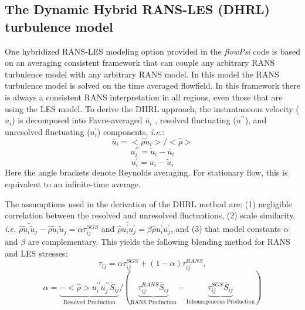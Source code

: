 \subsection{The Dynamic Hybrid RANS-LES (DHRL) turbulence model}

One hybridized RANS-LES modeling option provided in the {\it flowPsi}
code is based on an averaging consistent framework that can couple any
arbitrary RANS turbulence model with any arbitrary RANS model.  In
this model the RANS turbulence model is solved on the time averaged
flowfield.  In this framework there is always a consistent RANS
interpretation in all regions, even those that are using the LES
model.  To derive the DHRL approach, the instantaneous velocity
($u_i$) is decomposed into Favre-averaged $\overline{u}_i$ , resolved
fluctuating ($u^{\prime\prime}$), and unresolved fluctuating
($u^\prime_i$) components, {\it i.e.}:
\begin{equation}
\overline{u}_i = <\hat{\rho} \tilde{u}_i>/<\hat{\rho}>
\end{equation}
\begin{equation}
u^{\prime\prime}_i = \tilde{u}_i - \overline{u}_i
\end{equation}
\begin{equation}
u^\prime_i = u_i - \tilde{u}_i
\end{equation}
Here the angle brackets denote Reynolds averaging.  For stationary flow, this is equivalent to an infinite-time average.

The assumptions used in the derivation of the DHRL method are: (1)
negligible correlation between the resolved and unresolved
fluctuations, (2) scale similarity, {\it i.e.}
$\hat{\rho}\widetilde{\tilde{u}_i\tilde{u}_j} -
\hat{\rho}\tilde{u}_i\tilde{u}_j = \alpha \tau^{SGS}_{ij}$ and
$\hat{\rho}\widetilde{u^\prime_i u^\prime_j} = \beta
\hat{\rho}\overline{u^{\prime}_i u^{\prime}_j}$, and (3) that model
constants $\alpha$ and $\beta$ are complementary.  This yields the
following blending method for RANS and LES stresses:
\begin{equation}
\tau_{ij} = \alpha \tau^{SGS}_{ij} + (1-\alpha)\tau^{RANS}_{ij},
\label{eq:dhrlblend}
\end{equation}
\begin{equation}
\alpha = \underbrace{-<\hat{\rho}> \overline{u^{\prime\prime}_i u^{\prime\prime}_j} \overline{S}_{ij}}_{\text{Resolved Production}}/ (\underbrace{\tau^{RANS}_{ij} \overline S_{ij}}_{\text{RANS Production}} - \underbrace{ \overline{\tau}^{SGS}_{ij} \overline{S}_{ij}}_{\text{Inhomogeneous Production}})
\label{eq:dhrlswitch}
\end{equation}

